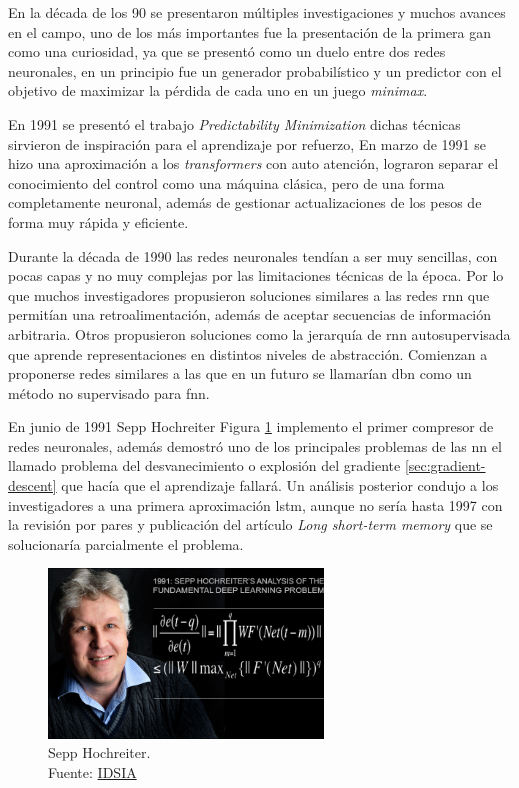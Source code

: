 En la década de los 90 se presentaron múltiples investigaciones y muchos avances en el campo, uno de los más importantes fue la presentación de la primera \acrshort{gan} como una curiosidad, ya que se presentó como un duelo entre dos redes neuronales, en un principio fue un generador probabilístico y un predictor con el objetivo de maximizar la pérdida de cada uno en un juego \textit{minimax}.

En 1991 se presentó el trabajo \textit{Predictability Minimization} \cite{urgen1991learning} dichas técnicas sirvieron de inspiración para el aprendizaje por refuerzo,
En marzo de 1991 se hizo una aproximación a los \textit{transformers} con auto atención, lograron separar el conocimiento del control como una máquina clásica, pero de una forma completamente neuronal, además de gestionar actualizaciones de los pesos de forma muy rápida y eficiente.

Durante la década de 1990 las redes neuronales tendían a ser muy sencillas, con pocas capas y no muy complejas por las limitaciones técnicas de la época.
Por lo que muchos investigadores propusieron soluciones similares a las redes \acrshort{rnn} que permitían una retroalimentación, además de aceptar secuencias de información arbitraria.
Otros propusieron soluciones como la jerarquía de \acrshort{rnn} autosupervisada que aprende representaciones en distintos niveles de abstracción.
Comienzan a proponerse redes similares a las que en un futuro se llamarían \acrshort{dbn} como un método no supervisado para \acrshort{fnn}.

En junio de 1991 {Sepp Hochreiter} Figura \ref{fig:sepp-hochreiter} implemento el primer compresor de redes neuronales, además demostró uno de los principales problemas de las \acrshort{nn} el llamado problema del desvanecimiento o explosión del gradiente \ref{sec:gradient-descent} que hacía que el aprendizaje fallará.
Un análisis posterior condujo a los investigadores a una primera aproximación \acrshort{lstm}, aunque no sería hasta 1997 con la revisión por pares y publicación del artículo \textit{Long short-term memory} \cite{hochreiter1997long} que se solucionaría parcialmente el problema.

\begin{figure}[H]
    \centering
    \includegraphics[width=0.65\textwidth]{figures/Sepp Hochreiter.jpg}
    \caption{Sepp Hochreiter.\\Fuente: \href{https://people.idsia.ch/~juergen/fundamentaldeeplearningproblem.html}{IDSIA}}
    \label{fig:sepp-hochreiter}
\end{figure}

